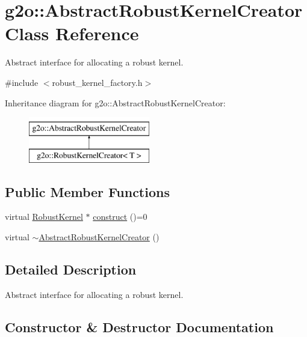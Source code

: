 \hypertarget{classg2o_1_1_abstract_robust_kernel_creator}{}\section{g2o\+:\+:Abstract\+Robust\+Kernel\+Creator Class Reference}
\label{classg2o_1_1_abstract_robust_kernel_creator}


Abstract interface for allocating a robust kernel.  




{\ttfamily \#include $<$robust\+\_\+kernel\+\_\+factory.\+h$>$}

Inheritance diagram for g2o\+:\+:Abstract\+Robust\+Kernel\+Creator\+:\begin{figure}[H]
\begin{center}
\leavevmode
\includegraphics[height=2.000000cm]{classg2o_1_1_abstract_robust_kernel_creator}
\end{center}
\end{figure}
\subsection*{Public Member Functions}
\begin{DoxyCompactItemize}
\item 
virtual \mbox{\hyperlink{classg2o_1_1_robust_kernel}{Robust\+Kernel}} $\ast$ \mbox{\hyperlink{classg2o_1_1_abstract_robust_kernel_creator_a3022ab9279e52151d37f8cb4d1524d47}{construct}} ()=0
\item 
virtual \mbox{\hyperlink{classg2o_1_1_abstract_robust_kernel_creator_af62964a80bc9f76d837df0913057f8f7}{$\sim$\+Abstract\+Robust\+Kernel\+Creator}} ()
\end{DoxyCompactItemize}


\subsection{Detailed Description}
Abstract interface for allocating a robust kernel. 

\subsection{Constructor \& Destructor Documentation}
\mbox{\label{classg2o_1_1_abstract_robust_kernel_creator_af62964a80bc9f76d837df0913057f8f7}} 
